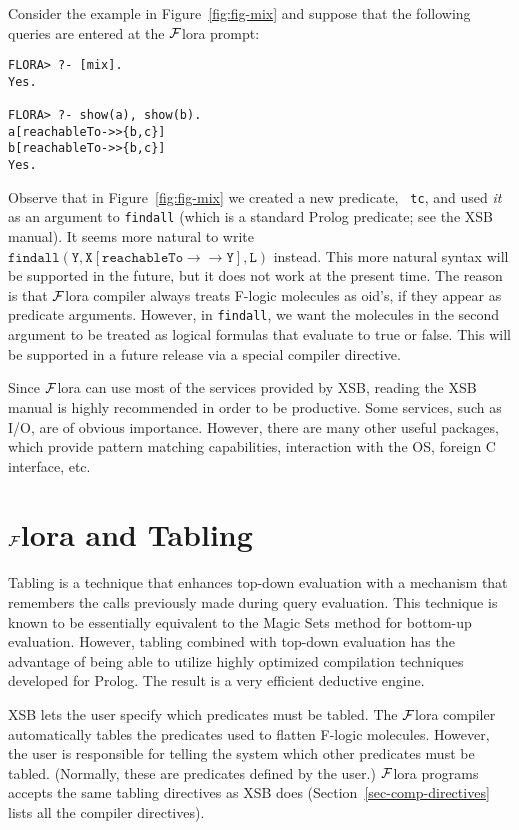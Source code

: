 \documentclass[11pt]{article}
\newcommand{\mvd}{\ensuremath{{\rightarrow\!\!\!\!\rightarrow}}}  %
\newcommand{\FLORA}{{\mbox{${\cal F}${\sc lora}}}\xspace}
\newcommand{\fl}{{F-logic}\xspace}
\begin{document}
Consider the example in Figure~\ref{fig:fig-mix} and suppose that the
following queries are entered at the \FLORA prompt:
\begin{verbatim}
FLORA> ?- [mix].
Yes.

FLORA> ?- show(a), show(b).
a[reachableTo->>{b,c}]
b[reachableTo->>{b,c}]
Yes.
\end{verbatim}

Observe that in Figure~\ref{fig:fig-mix} we created a new predicate, {\tt
  tc}, and used \emph{it} as an argument to {\tt findall} (which is a
standard Prolog predicate; see the XSB manual). It seems more natural to
write $\mathtt{findall(Y,X[reachableTo{\mvd}Y],L)}$ instead.  This more
natural syntax will be supported in the future, but it does not work at the
present time. The reason is that \FLORA compiler always treats \fl
molecules as oid's, if they appear as predicate arguments.  However, in
{\tt findall}, we want the molecules in the second argument to be treated
as logical formulas that evaluate to true or false.  This will be supported
in a future release via a special compiler directive.

Since \FLORA can use most of the services provided by XSB, reading the XSB
manual is highly recommended in order to be productive. Some services, such
as I/O, are of obvious importance. However, there are many other useful
packages, which provide pattern matching capabilities, interaction with the
OS, foreign C interface, etc.

\section{\FLORA and Tabling}\label{sec-tabling-flora}

Tabling is a technique that enhances top-down evaluation with a mechanism
that remembers the calls previously made during query evaluation.
This technique is known to be essentially equivalent to the Magic Sets
method for bottom-up evaluation. However, tabling combined with top-down
evaluation has the advantage of being able to utilize highly optimized
compilation techniques developed for Prolog. The result is a very efficient
deductive engine.

XSB lets the user specify which predicates must be tabled.  The \FLORA
compiler automatically tables the predicates used to flatten \fl molecules.
However, the user is responsible for telling the system which other
predicates must be tabled. (Normally, these are predicates defined by the
user.)  \FLORA programs accepts the same tabling directives as XSB does
(Section~\ref{sec-comp-directives} lists all the compiler directives).
\end{document}
